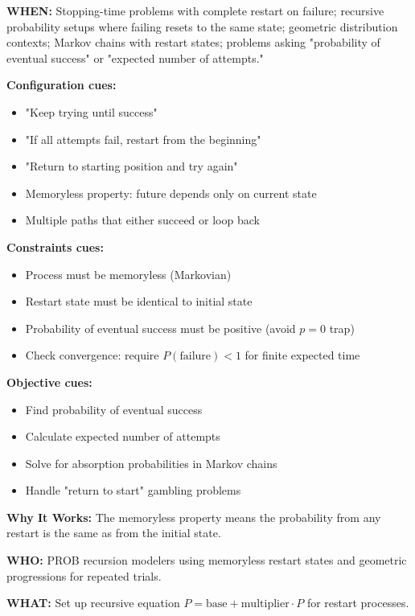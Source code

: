 \documentclass[12pt]{article}
\begin{document}
\textbf{WHEN:} Stopping-time problems with complete restart on failure; recursive probability setups where failing resets to the same state; geometric distribution contexts; Markov chains with restart states; problems asking "probability of eventual success" or "expected number of attempts."

\textbf{Configuration cues:}
\begin{itemize}
    \item "Keep trying until success"
    \item "If all attempts fail, restart from the beginning"
    \item "Return to starting position and try again"
    \item Memoryless property: future depends only on current state
    \item Multiple paths that either succeed or loop back
\end{itemize}

\textbf{Constraints cues:}
\begin{itemize}
    \item Process must be memoryless (Markovian)
    \item Restart state must be identical to initial state
    \item Probability of eventual success must be positive (avoid $p = 0$ trap)
    \item Check convergence: require $P(\text{failure}) < 1$ for finite expected time
\end{itemize}

\textbf{Objective cues:}
\begin{itemize}
    \item Find probability of eventual success
    \item Calculate expected number of attempts
    \item Solve for absorption probabilities in Markov chains
    \item Handle "return to start" gambling problems
\end{itemize}

\textbf{Why It Works:} The memoryless property means the probability from any restart is the same as from the initial state.

\textbf{WHO:} PROB recursion modelers using memoryless restart states and geometric progressions for repeated trials.

\textbf{WHAT:} Set up recursive equation $P = \text{base} + \text{multiplier} \cdot P$ for restart processes.
\end{document}
